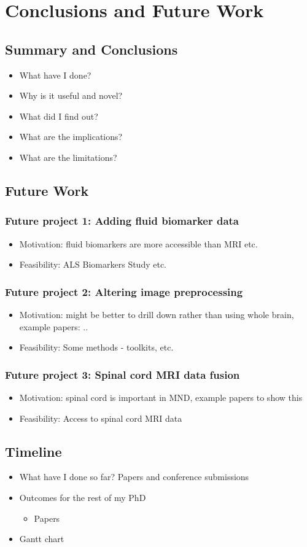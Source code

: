 \chapter{Conclusions and Future Work}
\label{conclusions_and_future_work}

\section{Summary and Conclusions}
\begin{itemize}
    \item What have I done?
    \item Why is it useful and novel?
    \item What did I find out?
    \item What are the implications?
    \item What are the limitations?
\end{itemize}

\section{Future Work}
\subsection{Future project 1: Adding fluid biomarker data}
\begin{itemize}
    \item Motivation: fluid biomarkers are more accessible than MRI etc.
    \item Feasibility: ALS Biomarkers Study etc.
\end{itemize}

\subsection{Future project 2: Altering image preprocessing}
\begin{itemize}
    \item Motivation: might be better to drill down rather than using whole brain, example papers: ..
    \item Feasibility: Some methods - toolkits, etc.
\end{itemize}

\subsection{Future project 3: Spinal cord MRI data fusion}
\begin{itemize}
    \item Motivation: spinal cord is important in MND, example papers to show this
    \item Feasibility: Access to spinal cord MRI data
\end{itemize}

\section{Timeline}
\begin{itemize}
    \item What have I done so far? Papers and conference submissions
    \item Outcomes for the rest of my PhD
    \begin{itemize}
        \item Papers
    \end{itemize}
    \item Gantt chart
\end{itemize}
